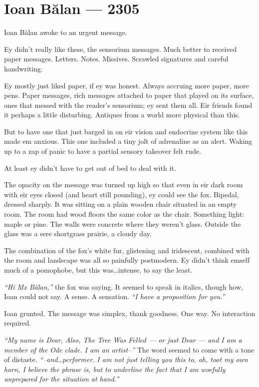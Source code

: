 \hypertarget{ioan-bux103lan-2305}{%
\chapter*{Ioan Bălan — 2305}\label{ioan-bux103lan-2305}}

Ioan Bălan awoke to an urgent message.

Ey didn't really like these, the sensorium messages. Much better to received paper messages. Letters. Notes. Missives. Scrawled signatures and careful handwriting.

Ey mostly just liked paper, if ey was honest. Always accruing more paper, more pens. Paper messages, rich messages attached to paper that played on its surface, ones that messed with the reader's sensorium; ey sent them all. Eir friends found it perhaps a little disturbing. Antiques from a world more physical than this.

But to have one that just barged in on eir vision and endocrine system like this made em anxious. This one included a tiny jolt of adrenaline as an alert. Waking up to a zap of panic to have a partial sensory takeover felt rude.

At least ey didn't have to get out of bed to deal with it.

The opacity on the message was turned up high so that even in eir dark room with eir eyes closed (and heart still pounding), ey could see the fox. Bipedal, dressed sharply. It was sitting on a plain wooden chair situated in an empty room. The room had wood floors the same color as the chair. Something light: maple or pine. The walls were concrete where they weren't glass. Outside the glass was a sere shortgrass prairie, a cloudy day.

The combination of the fox's white fur, glistening and iridescent, combined with the room and landscape was all so painfully postmodern. Ey didn't think emself much of a pomophobe, but this was\ldots{}intense, to say the least.

\emph{``Hi Mx Bălan,''} the fox was saying. It seemed to speak in italics, though how, Ioan could not say. A sense. A sensation. \emph{``I have a proposition for you.''}

Ioan grunted. The message was simplex, thank goodness. One way. No interaction required.

\emph{``My name is Dear, Also, The Tree Was Felled — or just Dear — and I am a member of the Ode clade. I am an artist--''} The word seemed to come with a tone of distaste. \emph{``--and\ldots{}performer. I am not just telling you this to, ah, toot my own horn, I believe the phrase is, but to underline the fact that I am woefully unprepared for the situation at hand.''}

